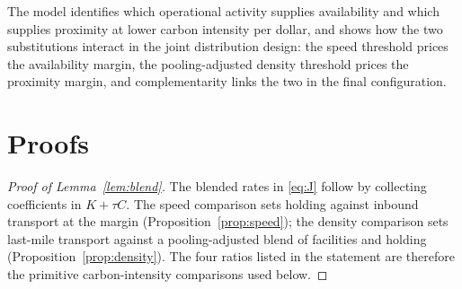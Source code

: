 \documentclass[11pt]{article}
\theoremstyle{definition}
\theoremstyle{remark}
\theoremstyle{plain}
\begin{document}
The model identifies which operational activity supplies availability and which supplies proximity at
lower carbon intensity per dollar, and shows how the two substitutions interact in the joint distribution
design: the speed threshold prices the availability margin, the pooling-adjusted density threshold prices
the proximity margin, and complementarity links the two in the final configuration.

\appendix
\section{Proofs}\label{app:proofs}

\begin{proof}[Proof of Lemma~\ref{lem:blend}]
The blended rates in \eqref{eq:J} follow by collecting coefficients in $K+\tau C$. The speed comparison sets
holding against inbound transport at the margin (Proposition~\ref{prop:speed}); the density comparison sets
last-mile transport against a pooling-adjusted blend of facilities and holding
(Proposition~\ref{prop:density}). The four ratios listed in the statement are therefore the primitive
carbon-intensity comparisons used below.
\end{proof}
\end{document}
